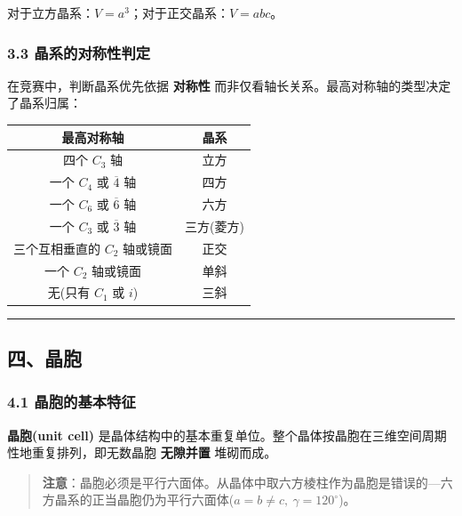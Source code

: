 \documentclass[a4paper,11pt]{ctexart}
\newcounter{none}
\newcommand{\箭}{\ensuremath{\rightarrow}}
\newcommand{\左箭}{\ensuremath{\leftarrow}}
\newcommand{\上箭}{\ensuremath{\uparrow}}
\newcommand{\下箭}{\ensuremath{\downarrow}}
\newcommand{\衡}{\ensuremath{\rightleftharpoons}}
\newcommand{\双箭}{\ensuremath{\leftrightarrow}}
\newcommand{\约等于}{\ensuremath{\approx}}
\newcommand{\小于等于}{\ensuremath{\leq}}
\newcommand{\大于等于}{\ensuremath{\geq}}
\newcommand{\不等于}{\ensuremath{\neq}}
\newcommand{\西格马}{\ensuremath{\sigma}}
\newcommand{\派}{\ensuremath{\pi}}
\begin{document}
对于立方晶系：\(V = a^3\)；对于正交晶系：\(V = abc\)。

\subsubsection{3.3 晶系的对称性判定}\label{ux6676ux7cfbux7684ux5bf9ux79f0ux6027ux5224ux5b9a}

在竞赛中，判断晶系优先依据 \textbf{对称性} 而非仅看轴长关系。最高对称轴的类型决定了晶系归属：

{\def\LTcaptype{none} %
\begin{longtable}[]{@{}cc@{}}
\toprule\noalign{}
最高对称轴 & 晶系 \\
\midrule\noalign{}
\endhead
\bottomrule\noalign{}
\endlastfoot
四个 \(C_3\) 轴 & 立方 \\
一个 \(C_4\) 或 \(\overline{4}\) 轴 & 四方 \\
一个 \(C_6\) 或 \(\overline{6}\) 轴 & 六方 \\
一个 \(C_3\) 或 \(\overline{3}\) 轴 & 三方(菱方) \\
三个互相垂直的 \(C_2\) 轴或镜面 & 正交 \\
一个 \(C_2\) 轴或镜面 & 单斜 \\
无(只有 \(C_1\) 或 \(i\)) & 三斜 \\
\end{longtable}
}

\begin{center}\rule{0.5\linewidth}{0.5pt}\end{center}

\subsection{四、晶胞}\label{ux56dbux6676ux80de}

\subsubsection{4.1 晶胞的基本特征}\label{ux6676ux80deux7684ux57faux672cux7279ux5f81}

\textbf{晶胞(unit cell)} 是晶体结构中的基本重复单位。整个晶体按晶胞在三维空间周期性地重复排列，即无数晶胞 \textbf{无隙并置} 堆砌而成。

\begin{quote}
\textbf{注意}：晶胞必须是平行六面体。从晶体中取六方棱柱作为晶胞是错误的---六方晶系的正当晶胞仍为平行六面体(\(a = b \neq c,\ \gamma = 120^\circ\))。
\end{quote}
\end{document}
